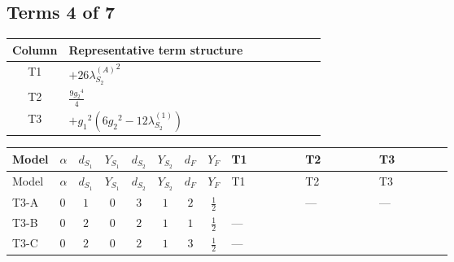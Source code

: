 \documentclass[8pt]{article}
\begin{document}
\begin{landscape}
\subsection*{Terms 4 of 7}
\begin{center}
\begin{tabular}{@{}c >{\raggedright\arraybackslash}p{0.82\linewidth}@{}}
\toprule
Column & Representative term structure \\
\midrule
T1 & \(\displaystyle +26 {\lambda_{S_2}^{(A)}}^2\) \\
\midrule
T2 & \(\displaystyle \frac{9 {g_2}^4}{4}\) \\
\midrule
T3 & \(\displaystyle +{g_1}^2 \left(6 {g_2}^2-12 {\lambda_{S_2}^{(1)}}\right)\) \\
\midrule
\bottomrule
\end{tabular}
\end{center}
\smallskip
\tiny
\begin{longtable}{@{}llcccccc >{\raggedright\arraybackslash}p{0.21\linewidth} >{\raggedright\arraybackslash}p{0.21\linewidth} >{\raggedright\arraybackslash}p{0.21\linewidth}@{}}
\toprule
Model & $\alpha$ & $d_{S_1}$ & $Y_{S_1}$ & $d_{S_2}$ & $Y_{S_2}$ & $d_F$ & $Y_F$ & T1 & T2 & T3 \\
\midrule
\endfirsthead
\toprule
Model & $\alpha$ & $d_{S_1}$ & $Y_{S_1}$ & $d_{S_2}$ & $Y_{S_2}$ & $d_F$ & $Y_F$ & T1 & T2 & T3 \\
\midrule
\endhead
T3-A & $0$ & $1$ & $0$ & $3$ & $1$ & $2$ & $\frac{1}{2}$ & \scriptsize\adjustbox{max width=\linewidth}{$\begin{gathered} +26 {\lambda_{S_2}^{(A)}}^2\end{gathered}$} & --- & --- \\
\midrule
T3-B & $0$ & $2$ & $0$ & $2$ & $1$ & $1$ & $\frac{1}{2}$ & --- & \scriptsize\adjustbox{max width=\linewidth}{$\begin{gathered} \frac{9 {g_2}^4}{4}\end{gathered}$} & \scriptsize\adjustbox{max width=\linewidth}{$\begin{gathered} +{g_1}^2 \left(6 {g_2}^2-12 {\lambda_{S_2}^{(1)}}\right)\end{gathered}$} \\
\midrule
T3-C & $0$ & $2$ & $0$ & $2$ & $1$ & $3$ & $\frac{1}{2}$ & --- & \scriptsize\adjustbox{max width=\linewidth}{$\begin{gathered} \frac{9 {g_2}^4}{4}\end{gathered}$} & \scriptsize\adjustbox{max width=\linewidth}{$\begin{gathered} +{g_1}^2 \left(6 {g_2}^2-12 {\lambda_{S_2}^{(1)}}\right)\end{gathered}$} \\

\end{longtable}
\end{landscape}
\end{document}
